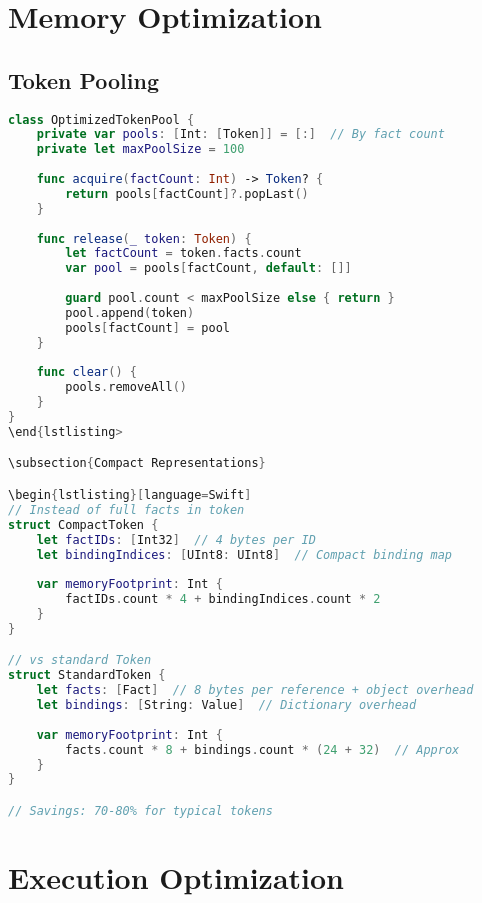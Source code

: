 \section{Memory Optimization}

\subsection{Token Pooling}

\begin{lstlisting}[language=Swift]
class OptimizedTokenPool {
    private var pools: [Int: [Token]] = [:]  // By fact count
    private let maxPoolSize = 100
    
    func acquire(factCount: Int) -> Token? {
        return pools[factCount]?.popLast()
    }
    
    func release(_ token: Token) {
        let factCount = token.facts.count
        var pool = pools[factCount, default: []]
        
        guard pool.count < maxPoolSize else { return }
        pool.append(token)
        pools[factCount] = pool
    }
    
    func clear() {
        pools.removeAll()
    }
}
\end{lstlisting>

\subsection{Compact Representations}

\begin{lstlisting}[language=Swift]
// Instead of full facts in token
struct CompactToken {
    let factIDs: [Int32]  // 4 bytes per ID
    let bindingIndices: [UInt8: UInt8]  // Compact binding map
    
    var memoryFootprint: Int {
        factIDs.count * 4 + bindingIndices.count * 2
    }
}

// vs standard Token
struct StandardToken {
    let facts: [Fact]  // 8 bytes per reference + object overhead
    let bindings: [String: Value]  // Dictionary overhead
    
    var memoryFootprint: Int {
        facts.count * 8 + bindings.count * (24 + 32)  // Approx
    }
}

// Savings: 70-80% for typical tokens
\end{lstlisting}

\section{Execution Optimization}

